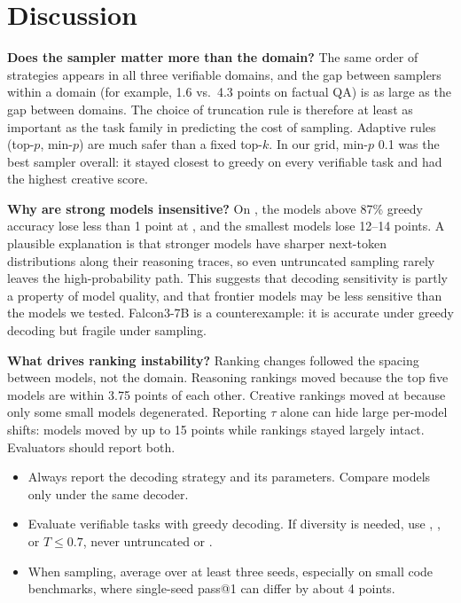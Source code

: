 \section{Discussion}
\label{sec:discussion}

{\bf Does the sampler matter more than the domain?} The same order of strategies appears in all three verifiable domains, and the gap between samplers within a domain (for example, 1.6 vs.\ 4.3 points on factual QA) is as large as the gap between domains. The choice of truncation rule is therefore at least as important as the task family in predicting the cost of sampling. Adaptive rules (top-$p$, min-$p$) are much safer than a fixed top-$k$. In our grid, min-$p$ 0.1 was the best sampler overall: it stayed closest to greedy on every verifiable task and had the highest creative score.

{\bf Why are strong models insensitive?} On \gsm, the models above 87\% greedy accuracy lose less than 1 point at \tone, and the smallest models lose 12--14 points. A plausible explanation is that stronger models have sharper next-token distributions along their reasoning traces, so even untruncated sampling rarely leaves the high-probability path. This suggests that decoding sensitivity is partly a property of model quality, and that frontier models may be less sensitive than the models we tested. Falcon3-7B is a counterexample: it is accurate under greedy decoding but fragile under sampling.

{\bf What drives ranking instability?} Ranking changes followed the spacing between models, not the domain. Reasoning rankings moved because the top five models are within 3.75 points of each other. Creative rankings moved at \tone because only some small models degenerated. Reporting $\tau$ alone can hide large per-model shifts: models moved by up to 15 points while rankings stayed largely intact. Evaluators should report both.

\begin{itemize}[leftmargin=*,itemsep=0pt,topsep=0pt]
    \item Always report the decoding strategy and its parameters. Compare models only under the same decoder.
    \item Evaluate verifiable tasks with greedy decoding. If diversity is needed, use \minp, \topp, or $T\leq0.7$, never untruncated \tone or \topk.
    \item When sampling, average over at least three seeds, especially on small code benchmarks, where single-seed pass@1 can differ by about 4 points.
\end{itemize}


